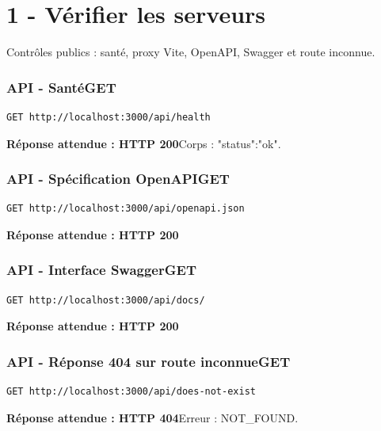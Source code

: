 \documentclass[10pt,a4paper]{article}
\newcommand{\expected}[2]{\par\smallskip\noindent\colorbox{forest!9}{\parbox{\dimexpr\linewidth-2\fboxsep}{\textcolor{forest}{\textbf{Réponse attendue : HTTP #1}}\hspace{0.4em}#2}}\par\medskip}
\newcommand{\reqheading}[3]{\subsubsection*{\textcolor{forest}{#1}\hfill\textcolor{ink}{\small #2}}\textit{#3}\par}
\begin{document}
\section{1 - Vérifier les serveurs}
Contrôles publics : santé, proxy Vite, OpenAPI, Swagger et route inconnue.
\reqheading{API - Santé}{GET}{}
\begin{lstlisting}[style=requestcode]
GET http://localhost:3000/api/health
\end{lstlisting}
\expected{200}{Corps : {"status":"ok"}.}
\vspace{0.25em}
\reqheading{API - Spécification OpenAPI}{GET}{}
\begin{lstlisting}[style=requestcode]
GET http://localhost:3000/api/openapi.json
\end{lstlisting}
\expected{200}{}
\vspace{0.25em}
\reqheading{API - Interface Swagger}{GET}{}
\begin{lstlisting}[style=requestcode]
GET http://localhost:3000/api/docs/
\end{lstlisting}
\expected{200}{}
\vspace{0.25em}
\reqheading{API - Réponse 404 sur route inconnue}{GET}{}
\begin{lstlisting}[style=requestcode]
GET http://localhost:3000/api/does-not-exist
\end{lstlisting}
\expected{404}{Erreur : NOT\_FOUND.}
\vspace{0.25em}
\newpage
\end{document}
